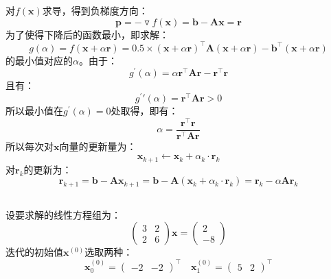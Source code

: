 \documentclass[12pt, onecolumn]{article}
\newcommand\normf{\fangsong}
\begin{document}
	对$f(\boldsymbol{x})$求导，得到负梯度方向：
	\begin{equation}
	\boldsymbol{p}=-\triangledown f(\boldsymbol{x})=\boldsymbol{b}-\boldsymbol{A}\boldsymbol{x}=\boldsymbol{r}
	\end{equation}
	为了使得下降后的函数最小，即求解：
	\begin{equation}
	g(\alpha)=f(\boldsymbol{x}+\alpha\boldsymbol{r})
	=0.5\times\left( \boldsymbol{x}+\alpha\boldsymbol{r}\right) ^\top\boldsymbol{A}\left( \boldsymbol{x}+\alpha\boldsymbol{r}\right)
	-\boldsymbol{b}^\top\left( \boldsymbol{x}+\alpha\boldsymbol{r}\right)
	\end{equation}
	的最小值对应的$\alpha$。由于：
	\begin{equation}
	g^\prime(\alpha)=\alpha\boldsymbol{r}^\top\boldsymbol{A}\boldsymbol{r}-\boldsymbol{r}^\top\boldsymbol{r}
	\end{equation}
	且有：
	\begin{equation}
	g^\prime\prime(\alpha)=\boldsymbol{r}^\top\boldsymbol{A}\boldsymbol{r}>0
	\end{equation}
	所以最小值在$g^\prime(\alpha)=0$处取得，即有：
	\begin{equation}
	\alpha=\frac{\boldsymbol{r}^\top\boldsymbol{r}}{\boldsymbol{r}^\top\boldsymbol{A}\boldsymbol{r}}
	\end{equation}
	所以每次对$\boldsymbol{x}$向量的更新量为：
	\begin{equation}
	\boldsymbol{x}_{k+1}\gets\boldsymbol{x}_{k}+\alpha_k\cdot\boldsymbol{r}_{k}
	\end{equation}
	对$\boldsymbol{r}_k$的更新为：
	\begin{equation}
	\boldsymbol{r}_{k+1}=\boldsymbol{b}-\boldsymbol{A}\boldsymbol{x}_{k+1}=
	\boldsymbol{b}-\boldsymbol{A}\left( \boldsymbol{x}_{k}+\alpha_k\cdot\boldsymbol{r}_{k}\right) =
	\boldsymbol{r}_k-\alpha\boldsymbol{A}\boldsymbol{r}_k
	\end{equation}
	
	\subsection{\normf{实验结果}}
	\subsubsection{\normf{小型矩阵测试}}
	设要求解的线性方程组为：
	\begin{equation}
	\begin{pmatrix}
	3&2\\2&6
	\end{pmatrix}\boldsymbol{x}=\begin{pmatrix}
	2\\-8
	\end{pmatrix}
	\end{equation}
	迭代的初始值$\boldsymbol{x}^{(0)}$选取两种：
	\begin{equation}
	\boldsymbol{x}_0^{(0)}=\begin{pmatrix}
	-2&-2
	\end{pmatrix}^\top
	\quad
	\boldsymbol{x}_1^{(0)}=\begin{pmatrix}
		5&2
		\end{pmatrix}^\top
	\end{equation}
	
\end{document}
